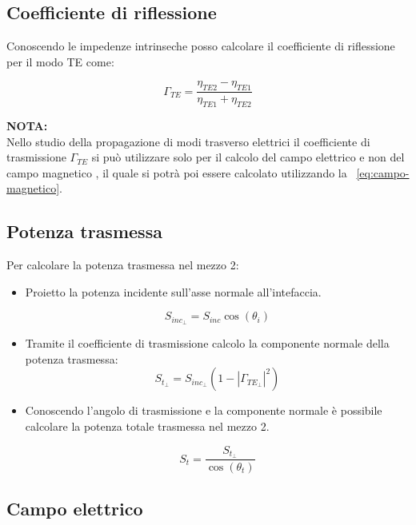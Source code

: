 \documentclass[10pt,a4paper]{report}
\begin{document}
		\subsection{Coefficiente di riflessione}
			Conoscendo le impedenze intrinseche posso calcolare il coefficiente di riflessione per il modo TE come:

			\begin{equation}
			\Gamma_{TE}=\frac{\eta_{TE2}-\eta_{TE1}}{\eta_{TE1}+\eta_{TE2}}
			\end{equation}

			 \textbf{NOTA:}
			 \\ 
			 Nello studio della propagazione di modi trasverso elettrici il coefficiente di trasmissione $\Gamma_{TE}$ si può utilizzare solo per il calcolo del campo elettrico e non del campo magnetico , il quale si potrà poi essere calcolato utilizzando la ~\ref{eq:campo-magnetico}.

		\subsection{Potenza trasmessa}

			Per calcolare la potenza trasmessa nel mezzo 2:
			\begin{itemize}
			\item Proietto la potenza incidente sull'asse normale all'intefaccia.

			\begin{equation}
			S_{inc_\perp}=S_{inc}\cos(\theta_i)
			\end{equation}

			\item Tramite il coefficiente di trasmissione calcolo la componente normale della potenza trasmessa:
			\begin{equation}
			S_{t_\perp}=S_{inc_\perp}(1-|\Gamma_{TE_\perp}|^2)
			\end{equation}

			\item Conoscendo l'angolo di trasmissione e la componente normale è possibile calcolare la potenza totale trasmessa nel mezzo 2.

			\begin{equation}
			S_{t}=\frac{S_{t_\perp}}{\cos(\theta_t)}
			\end{equation}
			\end{itemize}
		\subsection{Campo elettrico}
\end{document}
